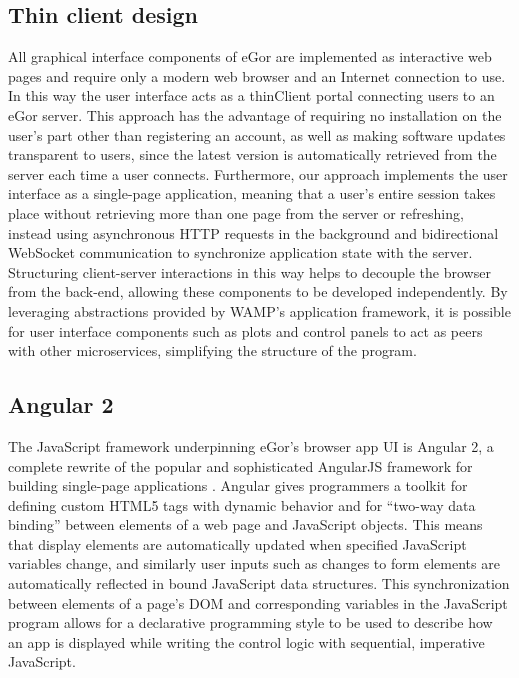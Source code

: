 \documentclass[../thesis]{subfiles}
\begin{document}
\subsection{Thin client design}
All graphical interface components of eGor are implemented as
interactive web pages and require only a modern web browser and an
Internet connection to use. In this way the user interface acts as a
\gls{thinClient} portal connecting users to an eGor server. This
approach has the advantage of requiring no installation on the user's
part other than registering an account, as well as making software
updates transparent to users, since the latest version is
automatically retrieved from the server each time a user
connects. Furthermore, our approach implements the user interface as a
single-page application, meaning that a user's entire session takes
place without retrieving more than one page from the server or
refreshing, instead using asynchronous HTTP requests in the background
and bidirectional WebSocket communication to synchronize application
state with the server. Structuring client-server interactions in this
way helps to decouple the browser from the back-end, allowing these
components to be developed independently. By leveraging abstractions
provided by \gls{WAMP}'s application framework, it is possible for
user interface components such as plots and control panels to act as
peers with other microservices, simplifying the structure of the
program.

\subsection{Angular 2}
The JavaScript framework underpinning eGor's browser app \gls{UI} is
Angular 2, a complete rewrite of the popular and sophisticated
AngularJS framework for building single-page applications
\cite{Angular}. Angular gives programmers a toolkit for defining
custom HTML5 tags with dynamic behavior and for ``two-way data
binding'' between elements of a web page and JavaScript objects. This
means that display elements are automatically updated when specified
JavaScript variables change, and similarly user inputs such as changes
to form elements are automatically reflected in bound JavaScript data
structures. This synchronization between elements of a page's
\gls{DOM} and corresponding variables in the JavaScript program allows
for a \gls{declarative} programming style to be used to describe how
an app is displayed while writing the control logic with sequential,
imperative JavaScript.
\end{document}

